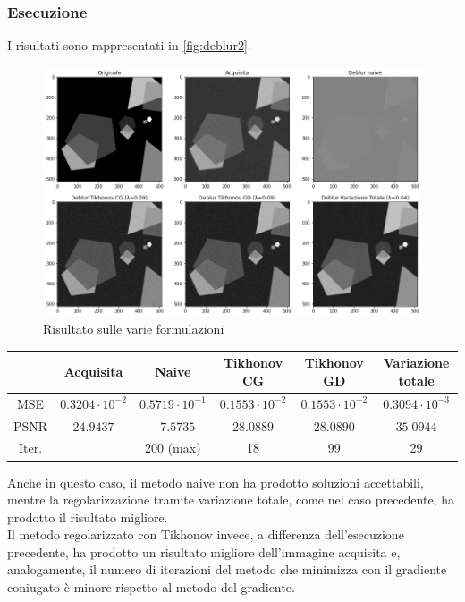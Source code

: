 \documentclass[11pt]{article}
\begin{document}
\subsubsection{Esecuzione}
I risultati sono rappresentati in \autoref{fig:deblur2}.\\
\begin{figure}[H]
    \centering
    \includegraphics[width=13cm]{esecuzione/2/deblur.png}
    \caption{Risultato sulle varie formulazioni}
    \label{fig:deblur2}
\end{figure}

\begin{center}
    \begin{tabular}{ |c|c|c|c|c|c| }
    \hline
    & Acquisita & Naive & Tikhonov CG & Tikhonov GD & Variazione totale \\ 
    \hline
    MSE & $0.3204 \cdot 10^{-2}$ & $0.5719 \cdot 10^{-1}$ & $0.1553 \cdot 10^{-2}$ & $0.1553 \cdot 10^{-2}$ & $0.3094 \cdot 10^{-3}$ \\ 
    PSNR & $24.9437$ & $-7.5735$ & $28.0889$ & $28.0890$ & $35.0944$ \\ 
    Iter. & & 200 (max) & 18 & 99 & 29 \\ 
    \hline
    \end{tabular}
\end{center}

Anche in questo caso, il metodo naive non ha prodotto soluzioni accettabili, mentre la regolarizzazione tramite variazione totale, come nel caso precedente, ha prodotto il risultato migliore.\\
Il metodo regolarizzato con Tikhonov invece, a differenza dell'esecuzione precedente, ha prodotto un risultato migliore dell'immagine acquisita e, 
analogamente, il numero di iterazioni del metodo che minimizza con il gradiente coniugato è minore rispetto al metodo del gradiente.
\end{document}
